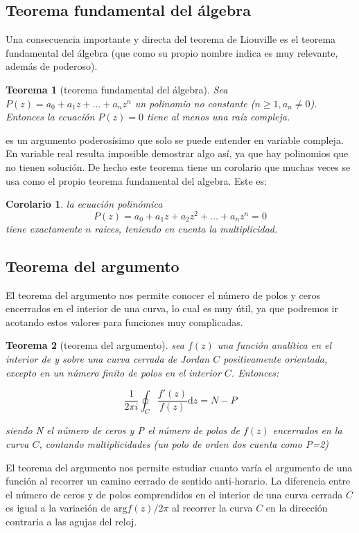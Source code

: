 \documentclass[12pt]{book}
\newcommand{\D}{\mathrm{d}}
\newcommand{\Arg}{\mathrm{arg}}
\newtheorem{theorem}{Teorema}[section]
\newtheorem{corollary}{Corolario}[theorem]
\begin{document}
\subsection{Teorema fundamental del álgebra}

Una consecuencia importante y directa del teorema de Liouville es el teorema fundamental del álgebra (que como su propio nombre indica es muy relevante, además de poderoso).

\begin{theorem}[teorema fundamental del álgebra]
Sea $P(z) = a_0+a_1 z+ \ldots+ a_n z^n $ un polinomio no constante ($n \geq 1, a_n \neq 0$). Entonces la ecuación $P(z)=0$ tiene al menos una raíz compleja.
\end{theorem}

es un argumento poderosísimo que solo se puede entender en variable compleja. En variable real resulta imposible demostrar algo así, ya que hay polinomios que  no tienen solución. De hecho este teorema tiene un corolario que muchas veces se usa como el propio teorema fundamental del algebra. Este es:

\begin{corollary}
la ecuación polinómica 
$$ P(z) = a_0 +a_1 z + a_2 z^2 + \ldots + a_n z^n = 0 $$
tiene exactamente $n$ raices, teniendo en cuenta la multiplicidad. 
\end{corollary}


\subsection{Teorema del argumento}

El teorema del argumento nos permite conocer el número de polos y ceros encerrados en el interior de una curva, lo cual es muy útil, ya que podremos ir acotando estos valores para funciones muy complicadas.

\begin{theorem}[teorema del argumento]
sea $f(z)$ una función analítica en el interior de y sobre una curva cerrada de Jordan $C$ positivamente orientada, excepto en un número finito de polos en el interior $C$. Entonces:

$$ \frac{1}{2 \pi i} \oint_C \frac{f'(z)}{f(z)} \D z = N - P $$

siendo N el número de ceros y P el número de polos de $f(z)$ encerrados en la curva $C$, contando multiplicidades (un polo de orden dos cuenta como P=2)
\end{theorem}


El teorema del argumento nos permite estudiar cuanto varía el argumento de una función al recorrer un camino cerrado de sentido anti-horario. La diferencia entre el número de ceros y de polos comprendidos en el interior de una curva cerrada $C$ es igual a la variación de $\Arg f(z) / 2 \pi$ al recorrer la curva $C$ en la dirección contraria a las agujas del reloj. 
\end{document}
